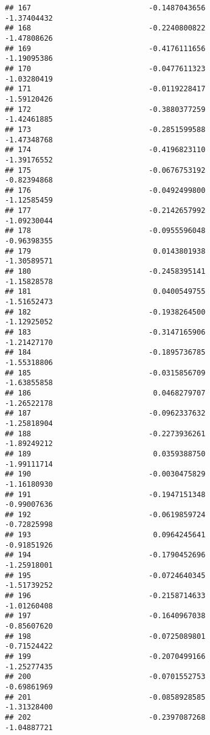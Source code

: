 \documentclass[
]{article}
\begin{document}
\begin{verbatim}
## 167                           -0.1487043656                -1.37404432
## 168                           -0.2240800822                -1.47808626
## 169                           -0.4176111656                -1.19095386
## 170                           -0.0477611323                -1.03280419
## 171                           -0.0119228417                -1.59120426
## 172                           -0.3880377259                -1.42461885
## 173                           -0.2851599588                -1.47348768
## 174                           -0.4196823110                -1.39176552
## 175                           -0.0676753192                -0.82394868
## 176                           -0.0492499800                -1.12585459
## 177                           -0.2142657992                -1.09230044
## 178                           -0.0955596048                -0.96398355
## 179                            0.0143801938                -1.30589571
## 180                           -0.2458395141                -1.15828578
## 181                            0.0400549755                -1.51652473
## 182                           -0.1938264500                -1.12925052
## 183                           -0.3147165906                -1.21427170
## 184                           -0.1895736785                -1.55318806
## 185                           -0.0315856709                -1.63855858
## 186                            0.0468279707                -1.26522178
## 187                           -0.0962337632                -1.25818904
## 188                           -0.2273936261                -1.89249212
## 189                            0.0359388750                -1.99111714
## 190                           -0.0030475829                -1.16180930
## 191                           -0.1947151348                -0.99007636
## 192                           -0.0619859724                -0.72825998
## 193                            0.0964245641                -0.91851926
## 194                           -0.1790452696                -1.25918001
## 195                           -0.0724640345                -1.51739252
## 196                           -0.2158714633                -1.01260408
## 197                           -0.1640967038                -0.85607620
## 198                           -0.0725089801                -0.71524422
## 199                           -0.2070499166                -1.25277435
## 200                           -0.0701552753                -0.69861969
## 201                           -0.0858928585                -1.31328400
## 202                           -0.2397087268                -1.04887721

\end{verbatim}
\end{document}
